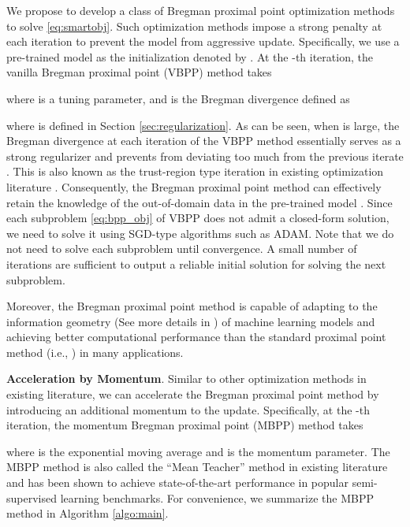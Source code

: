 \documentclass[11pt]{article} \usepackage{url}
\begin{document}
We propose to develop a class of Bregman proximal point optimization methods to solve \eqref{eq:smartobj}. Such optimization methods impose a strong penalty at each iteration to prevent the model from aggressive update. Specifically, we use a pre-trained model as the initialization denoted by . At the -th iteration, the vanilla Bregman proximal point (VBPP) method takes

where  is a tuning parameter, and  is the Bregman divergence defined as

where  is defined in Section \ref{sec:regularization}. As can be seen, when  is large, the Bregman divergence at each iteration of the VBPP method essentially serves as a strong regularizer and prevents  from deviating too much from the previous iterate . This is also known as the trust-region type iteration in existing optimization literature \citep{conn2000trust}. Consequently, the Bregman proximal point method can effectively retain the knowledge of the out-of-domain data in the pre-trained model . Since each subproblem \eqref{eq:bpp_obj} of VBPP does not admit a closed-form solution, we need to solve it using SGD-type algorithms such as ADAM. Note that we do not need to solve each subproblem until convergence. A small number of iterations are sufficient to output a reliable initial solution for solving the next subproblem.

Moreover, the Bregman proximal point method is capable of adapting to the information geometry (See more details in \citet{raskutti2015information}) of machine learning models and achieving better computational performance than the standard proximal point method (i.e., ) in many applications.


\noindent \textbf{Acceleration by Momentum}. Similar to other optimization methods in existing literature, we can accelerate the Bregman proximal point method by introducing an additional momentum to the update. Specifically, at the -th iteration, the momentum Bregman proximal point (MBPP) method takes

where  is the exponential moving average and  is the momentum parameter. The MBPP method is also called the ``Mean Teacher'' method in existing literature \citep{tarvainen2017mean} and has been shown to achieve state-of-the-art performance in popular semi-supervised learning benchmarks. For convenience, we summarize the  MBPP method in Algorithm \ref{algo:main}.
\end{document}
